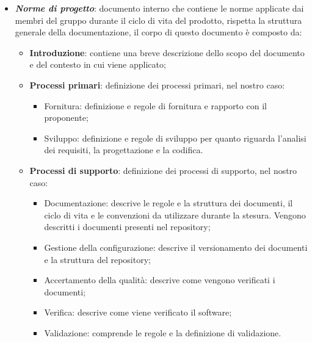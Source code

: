 \begin{itemize}
    \item \textit{\textbf{Norme di progetto}}: documento interno che contiene le norme applicate dai membri del gruppo durante il ciclo di vita del prodotto, rispetta la struttura generale della documentazione, il corpo di questo documento è composto da:
          \begin{itemize}
              \item \textbf{Introduzione}: contiene una breve descrizione dello scopo del documento e del contesto in cui viene applicato;
              \item \textbf{Processi primari}: definizione dei processi primari, nel nostro caso:
                    \begin{itemize}
                        \item Fornitura: definizione e regole di fornitura e rapporto con il proponente;
                        \item Sviluppo: definizione e regole di sviluppo per quanto riguarda l'analisi dei
                              requisiti, la progettazione e la codifica.
                    \end{itemize}

              \item \textbf{Processi di supporto}: definizione dei processi di supporto, nel nostro caso:
                    \begin{itemize}
                        \item Documentazione: descrive le regole e la struttura dei documenti, il ciclo di
                              vita e le convenzioni da utilizzare durante la stesura. Vengono descritti i
                              documenti presenti nel repository;
                        \item Gestione della configurazione: descrive il versionamento dei documenti e la
                              struttura del repository;
                        \item Accertamento della qualità: descrive come vengono verificati i documenti;
                        \item Verifica: descrive come viene verificato il software;
                        \item Validazione: comprende le regole e la definizione di validazione.
                    \end{itemize}


\end{itemize}
\end{itemize}
